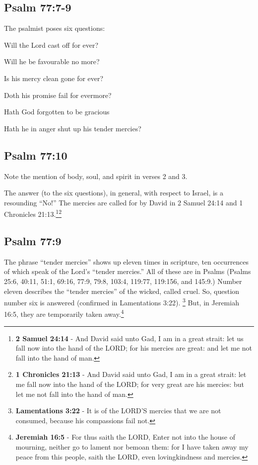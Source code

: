 \subsection{Psalm 77:7-9}
The psalmist poses six questions:
\begin{compactenum}
    \item Will the Lord cast off for ever?
    \item Will he be favourable no more?
    \item Is his mercy clean gone for ever?
    \item Doth his promise fail for evermore?
    \item Hath God forgotten to be gracious 
    \item Hath he in anger shut up his tender mercies?\\
\end{compactenum}

\subsection{Psalm 77:10}
Note the mention of body, soul, and spirit in verses 2 and 3.


\noindent The answer (to the six questions), in general, with respect to Israel, is a resounding ``No!'' The mercies are called for by David in 2 Samuel 24:14 and 1 Chronicles 21:13.\footnote{\textbf{2 Samuel 24:14} - And David said unto Gad, I am in a great strait: let us fall now into the hand of the LORD; for his mercies are great: and let me not fall into the hand of man.}\footnote{\textbf{1 Chronicles 21:13} - And David said unto Gad, I am in a great strait: let me fall now into the hand of the LORD; for very great are his mercies: but let me not fall into the hand of man.}\cite{Ruckman1992PsalmsV2}

\subsection{Psalm 77:9}
The phrase ``tender mercies'' shows up eleven times in scripture, ten occurrences of which speak of the Lord's ``tender mercies.'' All of these are in Psalms (Psalms 25:6, 40:11, 51:1, 69:16, 77:9, 79:8, 103:4, 119:77, 119:156, and  145:9.) Number eleven describes the ``tender mercies'' of the wicked, called cruel. So, question number six is answered (confirmed in Lamentations 3:22). \footnote{\textbf{Lamentations 3:22} - It is of the LORD’S mercies that we are not consumed, because his compassions fail not.} But, in Jeremiah 16:5, they are temporarily taken away.\footnote{\textbf{Jeremiah 16:5} - For thus saith the LORD, Enter not into the house of mourning, neither go to lament nor bemoan them: for I have taken away my peace from this people, saith the LORD, even lovingkindness and mercies.}\cite{Ruckman1992PsalmsV2}

